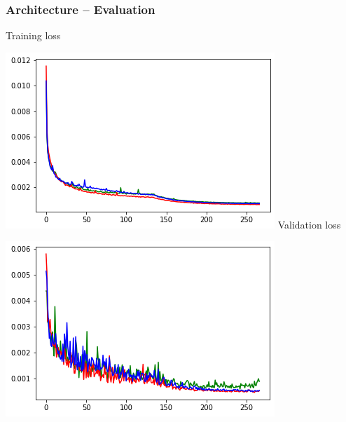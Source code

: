 \clearpage

\begin{frame}
    \frametitle{Architecture -- Evaluation}
    \vspace*{.1cm}
\begin{multicols}{2}
	Training loss
	
	\includegraphics[width=.9\columnwidth, height=.6\textheight]{./Ressourcen/Praesentation/Bilder/train_loss.png}%
    \vfill\columnbreak
    Validation loss
    
    \includegraphics[width=.9\columnwidth, height=.6\textheight]{./Ressourcen/Praesentation/Bilder/val_loss.png}%
\end{multicols}
    
\end{frame}
\clearpage